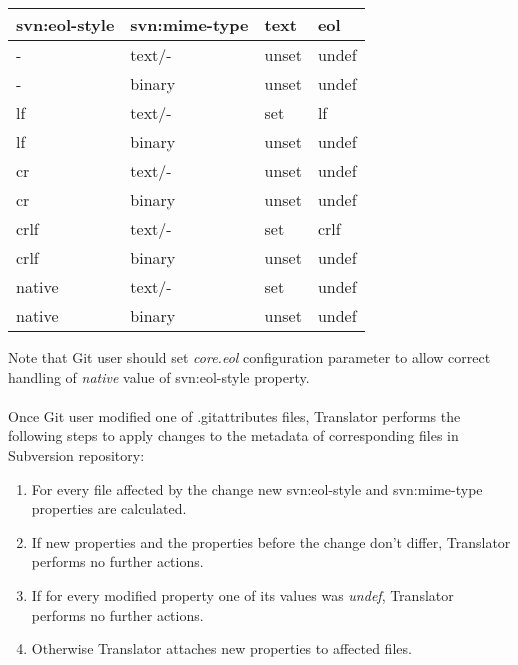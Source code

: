 \begin{center}
\begin{tabular}{ | l | l | l | l |}
	\hline
	svn:eol-style &   svn:mime-type &   text  & eol \\ \hline \hline
	-             &   text/-        &   unset & undef \footnotemark[1] \footnotemark[2] \\ \hline
	-             &   binary        &   unset & undef \\ \hline
	lf            &   text/-        &   set   & lf \\ \hline
	lf            &   binary        &   unset & undef \\ \hline
	cr            &   text/-        &   unset & undef  \footnotemark[3] \\ \hline
	cr            &   binary        &   unset & undef \\ \hline
	crlf          &   text/-        &   set   & crlf \\ \hline
	crlf          &   binary        &   unset & undef \\ \hline
	native        &   text/-        &   set   & undef \footnotemark[4] \\ \hline
	native        &   binary        &   unset & undef \\ \hline
\end{tabular}
\label{eol_mime_svn_to_git}
\end{center}

Note that Git user should set \emph{core.eol} configuration parameter to allow correct handling of \emph{native} value of svn:eol-style property.
\\\\
Once Git user modified one of .gitattributes files, Translator performs the following steps to apply changes to the metadata of corresponding files in Subversion repository:

\begin{enumerate}
\compactlist
\item For every file affected by the change new svn:eol-style and svn:mime-type properties are calculated.\\
\item If new properties and the properties before the change don't differ, Translator performs no further actions.\\
\item If for every modified property one of its values was \emph{undef}, Translator performs no further actions.\\
\item Otherwise Translator attaches new properties to affected files.\\
\end{enumerate}

